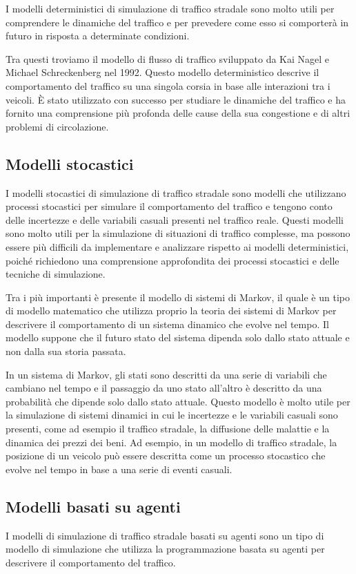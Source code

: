 \documentclass[11pt]{article}
\begin{document}
I modelli deterministici di simulazione di traffico stradale sono molto utili per comprendere le dinamiche del traffico e per prevedere come esso si comporterà in futuro in risposta a determinate condizioni.

Tra questi troviamo il modello di flusso di traffico sviluppato da Kai Nagel e Michael Schreckenberg nel 1992. Questo modello deterministico descrive il comportamento del traffico su una singola corsia in base alle interazioni tra i veicoli. È stato utilizzato con successo per studiare le dinamiche del traffico e ha fornito una comprensione più profonda delle cause della sua congestione e di altri problemi di circolazione.

\subsection{Modelli stocastici}
I modelli stocastici di simulazione di traffico stradale sono modelli che utilizzano processi stocastici per simulare il comportamento del traffico e tengono conto delle incertezze e delle variabili casuali presenti nel traffico reale. Questi modelli sono molto utili per la simulazione di situazioni di traffico complesse, ma possono essere più difficili da implementare e analizzare rispetto ai modelli deterministici, poiché richiedono una comprensione approfondita dei processi stocastici e delle tecniche di simulazione.

Tra i più importanti è presente il modello di sistemi di Markov, il quale è un tipo di modello matematico che utilizza proprio la teoria dei sistemi di Markov per descrivere il comportamento di un sistema dinamico che evolve nel tempo. Il modello suppone che il futuro stato del sistema dipenda solo dallo stato attuale e non dalla sua storia passata.

In un sistema di Markov, gli stati sono descritti da una serie di variabili che cambiano nel tempo e il passaggio da uno stato all'altro è descritto da una probabilità che dipende solo dallo stato attuale. Questo modello è molto utile per la simulazione di sistemi dinamici in cui le incertezze e le variabili casuali sono presenti, come ad esempio il traffico stradale, la diffusione delle malattie e la dinamica dei prezzi dei beni. Ad esempio, in un modello di traffico stradale, la posizione di un veicolo può essere descritta come un processo stocastico che evolve nel tempo in base a una serie di eventi casuali.

\subsection{Modelli basati su agenti}
I modelli di simulazione di traffico stradale basati su agenti sono un tipo di modello di simulazione che utilizza la programmazione basata su agenti per descrivere il comportamento del traffico.
\end{document}
